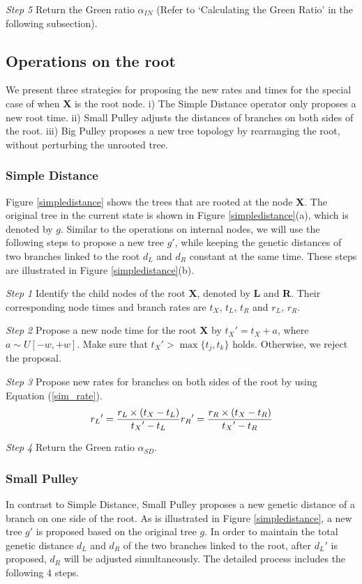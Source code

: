 \documentclass{bmcart}
\begin{document}
\emph{Step 5} Return the Green ratio ${\alpha_{IN}}$ (Refer to `Calculating the Green Ratio' in the following subsection).
\subsection*{Operations on the root}
We present three strategies for proposing the new rates and times for the special case of when \textbf{X} is the root node. i) The Simple Distance operator only proposes a new root time. ii) Small Pulley adjusts the distances of branches on both sides of the root. iii) Big Pulley proposes a new tree topology by rearranging the root, without perturbing the unrooted tree.
\subsubsection*{Simple Distance}
Figure \ref{simpledistance} shows the trees that are rooted at the node \textbf{X}. The original tree in the current state is shown in Figure \ref{simpledistance}(a), which is denoted by $g$. Similar to the operations on internal nodes, we will use the following steps to propose a new tree ${g}'$, while keeping the genetic distances of two branches linked to the root $d_L$ and $d_R$ constant at the same time. These steps are illustrated in Figure \ref{simpledistance}(b).

\emph{Step 1} Identify the child nodes of the root \textbf{X}, denoted by \textbf{L} and \textbf{R}. Their corresponding node times and branch rates are $t_X$, $t_L$, $t_R$ and $r_L$, $r_R$.

\emph{Step 2} Propose a new node time for the root \textbf{X} by ${t_X}' = {t_X} + a$, where $a \sim U[ - w, + w]$. Make sure that ${t_X}' > \max \{ {t_j},{t_k}\} $ holds. Otherwise, we reject the proposal.

\emph{Step 3} Propose new rates for branches on both sides of the root by using Equation (\ref{sim_rate}).
\begin{equation}
\label{sim_rate}
{r_L}' = \frac{{{r_L} \times ({{t_X} - {t_L}})}}{{{t_X}' - {t_L}}}\\
{r_R}' = \frac{{{r_R} \times ({{t_X} - {t_R}})}}{{{t_X}' - {t_R}}}
 \end{equation}

\emph{Step 4} Return the Green ratio ${\alpha_{SD}}$.
\subsubsection*{Small Pulley}
In contrast to Simple Distance, Small Pulley proposes a new genetic distance of a branch on one side of the root. As is illustrated in Figure \ref{simpledistance}, a new tree ${g}'$ is proposed based on the original tree $g$. In order to maintain the total genetic distance $d_L$ and $d_R$ of the two branches linked to the root, after ${d_L}'$ is proposed, $d_R$ will be adjusted simultaneously. The detailed process includes the following 4 steps.
\end{document}
